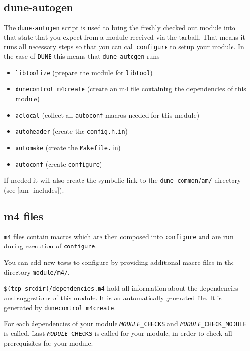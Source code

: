 \documentclass[11pt,a4paper,headinclude,footinclude,DIV16,normalheadings]{scrartcl}
\newcommand{\dune}{\texttt{DUNE}\xspace}
\newcommand{\autoconf}{\texttt{autoconf}\xspace}
\newcommand{\autogen}{\texttt{dune-autogen}\xspace}
\newcommand{\libtool}{\texttt{libtool}\xspace}
\newcommand{\configure}{\texttt{configure}\xspace}
\newcommand{\makefilein}{\texttt{Makefile.in}\xspace}
\newcommand{\topsrc}{\$(top\_srcdir)}
\begin{document}
\subsection{dune-autogen}
\label{autogen}

The \autogen script is used to bring the freshly checked out module
into that state that you expect from a module received via the
tarball. That means it runs all necessary steps so that you can call
\configure to setup your module. In the case of \dune this means that
\autogen runs
\begin{itemize}
\item \texttt{libtoolize} (prepare the module for \libtool)
\item \texttt{dunecontrol m4create} (create an m4 file containing the
  dependencies of this module)
\item \texttt{aclocal} (collect all \autoconf macros needed for this module)
\item \texttt{autoheader} (create the \texttt{config.h.in})
\item \texttt{automake} (create the \makefilein)
\item \texttt{autoconf} (create \configure)
\end{itemize}

If needed it will also create the symbolic link to the
\texttt{dune-common/am/} directory (see \ref{am_includes}).

\subsection{m4 files}
\label{m4files}

\texttt{m4} files contain macros which are then composed into
\configure and are run during execution of \configure.


You can add new tests to configure by providing additional macro files
in the directory \texttt{module/m4/}.


\texttt{\topsrc/dependencies.m4} hold all information about the
dependencies and suggestions of this module. It is an automatically
generated file. It is generated by \texttt{dunecontrol m4create}.

For each dependencies of your module \texttt{\emph{MODULE}\_CHECKS}
and \texttt{\emph{MODULE}\_CHECK\_MODULE} is called. Last
\texttt{\emph{MODULE}\_CHECKS} is called for your module, in order to
check all prerequisites for your module.
\end{document}
